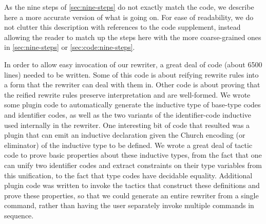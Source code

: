 \documentclass[a4paper,USenglish,cleveref,autoref,thm-restate]{lipics-v2021}
\begin{document}
\begin{minipage}[t][1cm]{\textwidth}
As the nine steps of \autoref{sec:nine-steps} do not exactly match the code, we describe here a more accurate version of what is going on.
For ease of readability, we do not clutter this description with references to the code supplement, instead allowing the reader to match up the steps here with the more coarse-grained ones in \autoref{sec:nine-steps} or \autoref{sec:code:nine-steps}.

In order to allow easy invocation of our rewriter, a great deal of code (about 6500 lines) needed to be written.
Some of this code is about reifying rewrite rules into a form that the rewriter can deal with them in.
Other code is about proving that the reified rewrite rules preserve interpretation and are well-formed.
We wrote some plugin code to automatically generate the inductive type of base-type codes and identifier codes, as well as the two variants of the identifier-code inductive used internally in the rewriter.
One interesting bit of code that resulted was a plugin that can emit an inductive declaration given the Church encoding (or eliminator) of the inductive type to be defined.
We wrote a great deal of tactic code to prove basic properties about these inductive types, from the fact that one can unify two identifier codes and extract constraints on their type variables from this unification, to the fact that type codes have decidable equality.
Additional plugin code was written to invoke the tactics that construct these definitions and prove these properties, so that we could generate an entire rewriter from a single command, rather than having the user separately invoke multiple commands in sequence.


\end{minipage}
\end{document}
